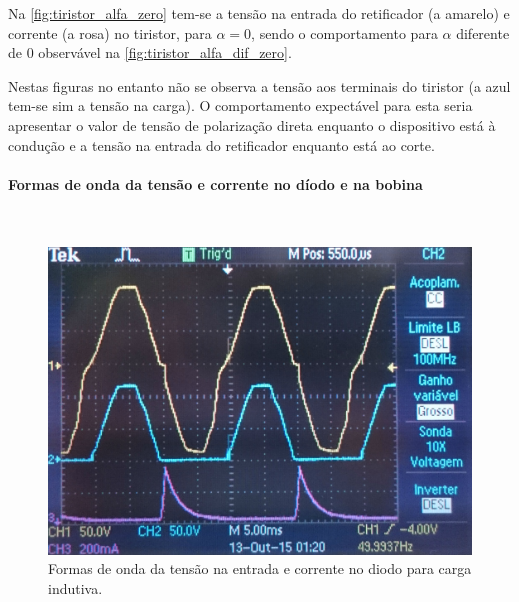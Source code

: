 \documentclass[a4paper,11pt]{article}
\numberwithin{equation}{section}
\begin{document}
Na \autoref{fig:tiristor_alfa_zero} tem-se a tensão na entrada do retificador (a amarelo) e corrente (a rosa) no tiristor, para $\alpha = 0$, sendo o comportamento para $\alpha$ diferente de $0$ observável na \autoref{fig:tiristor_alfa_dif_zero}.

Nestas figuras no entanto não se observa a tensão aos terminais do tiristor (a azul tem-se sim a tensão na carga). O comportamento expectável para esta seria apresentar o valor de tensão de polarização direta enquanto o dispositivo está à condução e a tensão na entrada do retificador enquanto está ao corte.

\paragraph{Formas de onda da tensão e corrente no díodo e na bobina}\mbox{}\

\begin{figure}[H]
	\centering
	\includegraphics[keepaspectratio=true, scale=0.12]{img/figs/diodo_alfa_zero}
	\caption{Formas de onda da tensão na entrada e corrente no diodo para carga indutiva.}
	\label{fig:diodo_alfa_zero}
	\vspace{-0.8em}
\end{figure}
\end{document}
